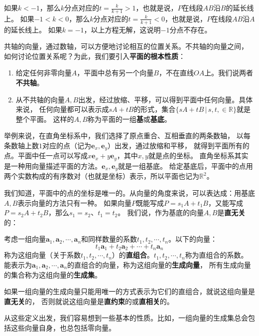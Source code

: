 \documentclass[12pt,UTF8]{ctexbook}
\begin{document}
如果$k<-1$，那么$k$分点对应的$t = \frac{k}{k+1} > 1$，也就是说，$P$在线段$AB$沿$B$的延长线上。
如果$-1<k<0$，那么$k$分点对应的$t = \frac{k}{k+1} < 0$，也就是说，$P$在线段$AB$沿$A$的延长线上。
如果$k=-1$，以上方程无解，这说明$-1$分点不存在。

共轴的向量，通过数轴，可以方便地讨论相互的位置关系。不共轴的向量之间，
如何讨论位置关系呢？为此，我们要引入\textbf{平面的根本性质}：
\begin{enumerate}
    \item 给定任何非零向量$A$，平面中总有另一个向量$B$，不在直线$OA$上。我们说两者\textbf{不共轴}。
    \item 从不共轴的向量$A, B$出发，经过放缩、平移，可以得到平面中任何向量。具体来说，
    任何向量都可以表示成$sA + tB$的形式，集合$\{sA + tB \,|\, s, t, \in\mathbb{R}\}$就是整个平面。
    这样的$A, B$称为平面的一组\textbf{基}或\textbf{基底}。
\end{enumerate}

举例来说，在直角坐标系中，我们选择了原点重合、互相垂直的两条数轴，
以每条数轴上数$1$对应的点（记为$\mathbf{e}_x, \mathbf{e}_y$）出发，通过放缩和平移，
就得到平面所有的点。平面中任一点可以写成$x\mathbf{e}_x + y\mathbf{e}_y$，其中$x,y$就是点的坐标。
直角坐标系其实是一种用向量描述平面的方法。$\mathbf{e}_x, \mathbf{e}_y$就是一组基底。
给定基底后，平面中的点用两个实数构成的有序数对（也就是坐标）表示，所以平面也记为$\mathbb{R}^2$。

我们知道，平面中的点的坐标是唯一的。从向量的角度来说，可以表达成：用基底$A, B$表示向量的方法只有一种。
如果向量$P$既能写成$P = s_1A + t_1B$，又能写成$P = s_2A + t_2B$，那么$s_1 = s_2$、$t_1 = t_2$。
我们说，作为基底的向量$A,B$是\textbf{直无关}的：
\begin{df}
    考虑一组向量$\mathbf{a}_1, \mathbf{a}_2, \cdots , \mathbf{a}_n$和同样数量的系数$t_1, t_2, \cdots, t_n$。以下的向量：
    $$ t_1\mathbf{a}_1 + t_2\mathbf{a}_2 + \cdots + t_n\mathbf{a}_n$$
    称为这组向量（关于系数$t_1, t_2, \cdots, t_n$）的\textbf{直组合}。$t_1, t_2, \cdots, t_n$称为直组合的系数。
    能表示为$\mathbf{a}_1, \mathbf{a}_2, \cdots , \mathbf{a}_n$的直组合的向量，称为这组向量的\textbf{生成向量}，
    所有生成向量的集合称为这组向量的\textbf{生成集}。

    如果一组向量的生成向量只能用唯一的方式表示为它们的直组合，就说这组向量是\textbf{直无关}的，
    否则就说这组向量是\textbf{直约束}的或\textbf{直相关}的。
\end{df}
从这些定义出发，我们容易想到一些基本的性质。比如，一组向量的生成集总会包括这些向量自身，也总包括零向量。
\end{document}
